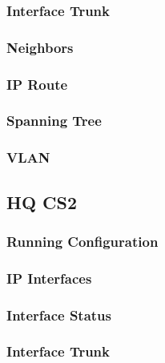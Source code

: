 \subsubsection{Interface Trunk}


\subsubsection{Neighbors}


\subsubsection{IP Route}


\subsubsection{Spanning Tree}


\subsubsection{VLAN}





\subsection{HQ CS2}
\subsubsection{Running Configuration}


\subsubsection{IP Interfaces}


\subsubsection{Interface Status}


\subsubsection{Interface Trunk}


